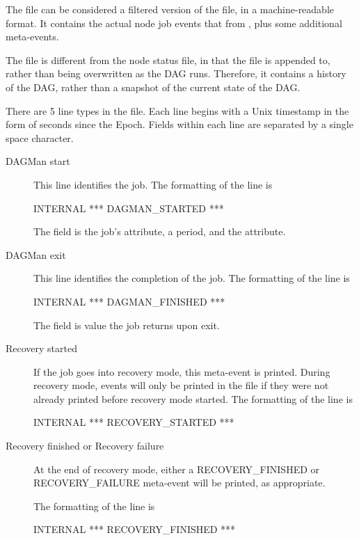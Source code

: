 The  file can be considered a filtered
version of the  file, in a machine-readable format.
It contains the actual node job events that from ,
plus some additional meta-events.

The  file is different from the node status file,
in that the  file is appended to,
rather than being overwritten as the DAG runs.
Therefore, it contains a history of the DAG,
rather than a snapshot of the current state of the DAG.

There are 5 line types in the  file.
Each line begins with a Unix timestamp in the form of seconds since the Epoch.
Fields within each line are separated by a single space character.
\begin{description}

\item [DAGMan start] 
This line identifies the  job.
The formatting of the line is

 INTERNAL *** DAGMAN\_STARTED  ***

The  field is the  job's 
 attribute, a period, and the  attribute. 

\item [DAGMan exit] 
This line identifies the completion of the  job.
The formatting of the line is

 INTERNAL *** DAGMAN\_FINISHED  ***

The  field is value the  job returns upon exit. 

\item [Recovery started] 
If the  job goes into recovery mode,
this meta-event is printed.
During recovery mode, events will only be printed in the file
if they were not already printed before recovery mode started.
The formatting of the line is

 INTERNAL *** RECOVERY\_STARTED ***

\item [Recovery finished or Recovery failure] 
At the end of recovery
mode, either a RECOVERY\_FINISHED or RECOVERY\_FAILURE meta-event will be
printed, as appropriate.

The formatting of the line is

 INTERNAL *** RECOVERY\_FINISHED ***


\end{description}

